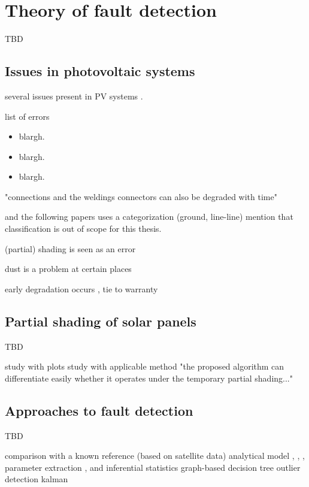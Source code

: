 \chapter{Theory of fault detection}
TBD

\section{Issues in photovoltaic systems}
several issues present in PV systems \cite{Baltus1997,King2002,Petrone2008}.

list of errors \cite{Stettler2005}
\begin{itemize}
\item blargh.
\item blargh.
\item blargh.
\end{itemize}

"connections and the weldings connectors can also be degraded with time" \cite{Houssein2010}

\cite{Zhao2010thesis} and the following papers \cite{Zhao2012tree,Zhao2013graph,Zhao2013outlier} uses a categorization (ground, line-line)
mention that classification is out of scope for this thesis.

(partial) shading is seen as an error \cite{Stettler2005} %

dust is a problem \cite{Mani2010} at certain places

early degradation occurs \cite{Munoz2011}, tie to warranty

\section{Partial shading of solar panels}
TBD

study with plots \cite{Alsayid2013} 
study with applicable method \cite{Firth2010}
"the proposed algorithm can differentiate easily whether it operates under the temporary partial shading..." \cite{Kang2012}

\section{Approaches to fault detection}
TBD

comparison with a known reference (based on satellite data) \cite{Stettler2005}
analytical model \cite{Chouder2010}, \cite{Raina2013}, \cite{Chao2008}, parameter extraction \cite{Eicker2005}, \cite{Chouder2009} and \cite{Walker2001}
inferential statistics \cite{Vergura2008,Vergura2009}
graph-based \cite{Zhao2013graph}
decision tree \cite{Zhao2012tree}
outlier detection \cite{Zhao2013outlier}
kalman \cite{Kang2012}

